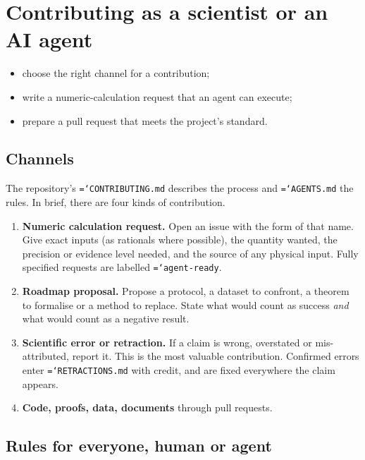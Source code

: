 \documentclass[11pt,a4paper,openany]{book}
\newcommand{\code}[1]{\texttt{\hyphenchar\font=`\-\relax #1}}
\theoremstyle{definition}
\theoremstyle{plain}
\begin{document}
\chapter{Contributing as a scientist or an AI agent}
\label{ch:contrib}

\begin{objectives}
\begin{itemize}
  \item choose the right channel for a contribution;
  \item write a numeric-calculation request that an agent can execute;
  \item prepare a pull request that meets the project's standard.
\end{itemize}
\end{objectives}

\section{Channels}

The repository's \code{CONTRIBUTING.md} describes the process and \code{AGENTS.md} the rules. In
brief, there are four kinds of contribution.
\begin{enumerate}
  \item \textbf{Numeric calculation request.} Open an issue with the form of that name. Give exact
        inputs (as rationals where possible), the quantity wanted, the precision or evidence level
        needed, and the source of any physical input. Fully specified requests are labelled
        \code{agent-ready}.
  \item \textbf{Roadmap proposal.} Propose a protocol, a dataset to confront, a theorem to
        formalise or a method to replace. State what would count as success \emph{and} what would
        count as a negative result.
  \item \textbf{Scientific error or retraction.} If a claim is wrong, overstated or mis-attributed,
        report it. This is the most valuable contribution. Confirmed errors enter
        \code{RETRACTIONS.md} with credit, and are fixed everywhere the claim appears.
  \item \textbf{Code, proofs, data, documents} through pull requests.
\end{enumerate}

\section{Rules for everyone, human or agent}
\end{document}
